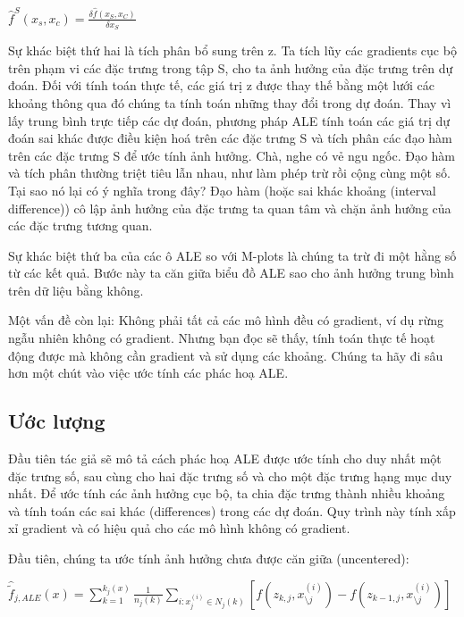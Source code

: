 \begin{center}
$\hat{f}^S(x_s,x_c)=\frac{\delta\hat{f}(x_S,x_C)}{\delta{}x_S}$
\end{center}

Sự khác biệt thứ hai là tích phân bổ sung trên z. Ta tích lũy các gradients cục bộ trên phạm vi các đặc trưng trong tập S, cho ta ảnh hưởng của đặc trưng trên dự đoán. Đối với tính toán thực tế, các giá trị z được thay thế bằng một lưới các khoảng thông qua đó chúng ta tính toán những thay đổi trong dự đoán. Thay vì lấy trung bình trực tiếp các dự đoán, phương pháp ALE tính toán các giá trị dự đoán sai khác được điều kiện hoá trên các đặc trưng S và tích phân các đạo hàm trên các đặc trưng S để ước tính ảnh hưởng. Chà, nghe có vẻ ngu ngốc. Đạo hàm và tích phân thường triệt tiêu lẫn nhau, như làm phép trừ rồi cộng cùng một số. Tại sao nó lại có ý nghĩa trong đây? Đạo hàm (hoặc sai khác khoảng (interval difference)) cô lập ảnh hưởng của đặc trưng ta quan tâm và chặn ảnh hưởng của các đặc trưng tương quan.

Sự khác biệt thứ ba của các ô ALE so với M-plots là chúng ta trừ đi một hằng số từ các kết quả. Bước này ta căn giữa biểu đồ ALE sao cho ảnh hưởng trung bình trên dữ liệu bằng không.

Một vấn đề còn lại: Không phải tất cả các mô hình đều có gradient, ví dụ rừng ngẫu nhiên không có gradient. Nhưng bạn đọc sẽ thấy, tính toán thực tế hoạt động được mà không cần gradient và sử dụng các khoảng. Chúng ta hãy đi sâu hơn một chút vào việc ước tính các phác hoạ ALE.

\subsection{Ước lượng}

Đầu tiên tác giả sẽ mô tả cách phác hoạ ALE được ước tính cho duy nhất một đặc trưng số, sau cùng cho hai đặc trưng số và cho một đặc trưng hạng mục duy nhất. Để ước tính các ảnh hưởng cục bộ, ta chia đặc trưng thành nhiều khoảng và tính toán các sai khác (differences) trong các dự đoán. Quy trình này tính xấp xỉ gradient và có hiệu quả cho các mô hình không có gradient.

Đầu tiên, chúng ta ước tính ảnh hưởng chưa được căn giữa (uncentered):
\begin{center}
$\hat{\tilde{f}}_{j,ALE}(x)=\sum_{k=1}^{k_j(x)}\frac{1}{n_j(k)}\sum_{i:x_{j}^{(i)}\in{}N_j(k)}\left[f(z_{k,j},x^{(i)}_{\setminus{}j})-f(z_{k-1,j},x^{(i)}_{\setminus{}j})\right]$
\end{center}

